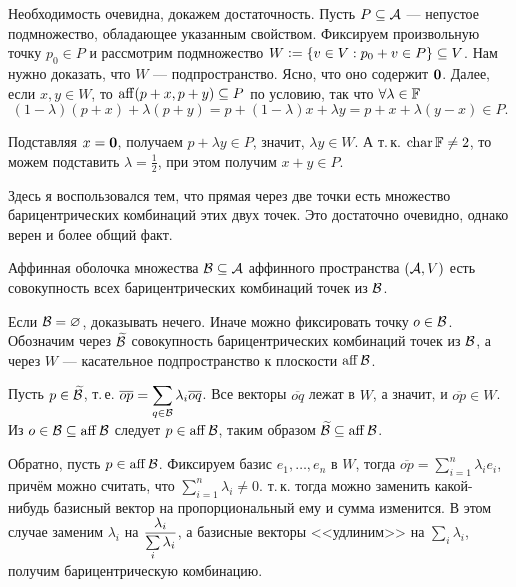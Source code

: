 \begin{solution}
    Необходимость очевидна, докажем достаточность. Пусть $P \subseteq \mathcal{A}$ --- непустое подмножество, обладающее указанным свойством. Фиксируем произвольную точку $p_0 \in P$ и рассмотрим подмножество $W \vcentcolon = \{v \in V : p_0 + v \in P\} \subseteq V$. Нам нужно доказать, что $W$ --- подпространство. Ясно, что оно содержит $\boldsymbol{0}$. Далее, если $x, y \in W$, то $\operatorname{aff}(p + x, p + y) \subseteq P$ по условию, так что $\forall \lambda \in \mathbb{F}$
    \[
        (1 - \lambda)(p + x) + \lambda(p + y) = p + (1 - \lambda)x + \lambda y = p + x + \lambda(y - x) \in P.
    \]

    Подставляя $x = \boldsymbol{0}$, получаем $p + \lambda y \in P$, значит, $\lambda y \in W$. А т.\,к. $\operatorname{char}\mathbb{F} \ne 2$, то можем подставить $\lambda = \frac{1}{2}$, при этом получим $x + y \in P$.
\end{solution}

Здесь я воспользовался тем, что прямая через две точки есть множество барицентрических комбинаций этих двух точек. Это достаточно очевидно, однако верен и более общий факт.

\begin{problem}[Из Винберга]
    Аффинная оболочка множества $\mathcal{B} \subseteq \mathcal{A}$ аффинного пространства $(\mathcal{A}, V)$ есть совокупность всех барицентрических комбинаций точек из $\mathcal{B}$.
\end{problem}

\begin{solution}
    Если $\mathcal{B} = \varnothing$, доказывать нечего. Иначе можно фиксировать точку $o \in \mathcal{B}$. Обозначим через $\widetilde{\mathcal{B}}$ совокупность барицентрических комбинаций точек из $\mathcal{B}$, а через $W$ --- касательное подпространство к плоскости $\operatorname{aff}\mathcal{B}$.

    Пусть $p \in \widetilde{\mathcal{B}}$, т.\,е. $\displaystyle\overline{op} = \sum_{q \in \mathcal{B}}\lambda_i\overline{oq}$. Все векторы $\overline{oq}$ лежат в $W$, а значит, и $\overline{op} \in W$. Из $o \in \mathcal{B} \subseteq \operatorname{aff}\mathcal{B}$ следует $p \in \operatorname{aff}\mathcal{B}$, таким образом $\widetilde{\mathcal{B}} \subseteq \operatorname{aff}\mathcal{B}$.

    Обратно, пусть $p \in \operatorname{aff}\mathcal{B}$. Фиксируем базис $e_1, \ldots, e_n$ в $W$, тогда $\overline{op} = \sum\limits_{i = 1}^n\lambda_ie_i$, причём можно считать, что $\sum\limits_{i = 1}^n\lambda_i \ne 0$. т.\,к. тогда можно заменить какой-нибудь базисный вектор на пропорциональный ему и сумма изменится. В этом случае заменим $\lambda_i$ на $\displaystyle\frac{\lambda_i}{\sum\limits_i\lambda_i}$, а базисные векторы <<удлиним>> на $\sum\limits_i\lambda_i$, получим барицентрическую комбинацию.
\end{solution}

